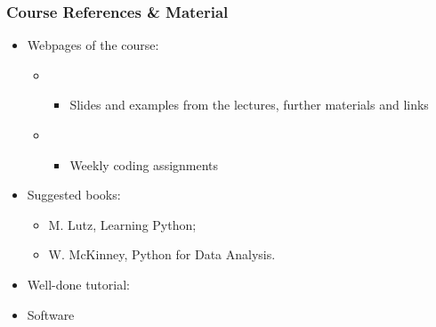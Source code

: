 \begin{frame}
  \frametitle{Course References \& Material}
  \begin{itemize}
  \item Webpages of the course:
	\begin{itemize}
	\item \myurl{\homepage}
  \\ %
  \begin{itemize}
  \item Slides and examples from the lectures, further materials and links
  \end{itemize}
		\item \myurl{\replstudents}
  \begin{itemize}
  \item Weekly coding assignments
  \end{itemize}
  \end{itemize}
  \end{itemize}
\begin{itemize}
\item Suggested books: 
\begin{itemize}
	\item M. Lutz, Learning Python; 
	\item W. McKinney, Python for Data Analysis.
	  \end{itemize}
\item Well-done tutorial: 
\item Software

\end{itemize}
\end{frame}
